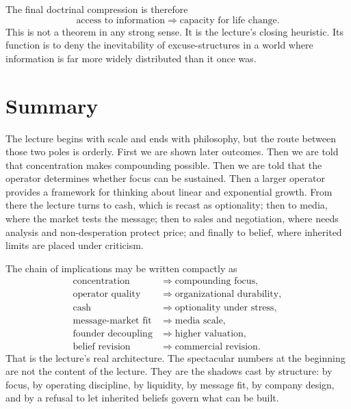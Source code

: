The final doctrinal compression is therefore
\begin{equation}
\text{access to information}\Rightarrow \text{capacity for life change}.
\end{equation}
This is not a theorem in any strong sense. It is the lecture's closing heuristic. Its function is to deny the inevitability of excuse-structures in a world where information is far more widely distributed than it once was.

\section{Summary}

The lecture begins with scale and ends with philosophy, but the route between those two poles is orderly. First we are shown later outcomes. Then we are told that concentration makes compounding possible. Then we are told that the operator determines whether focus can be sustained. Then a larger operator provides a framework for thinking about linear and exponential growth. From there the lecture turns to cash, which is recast as optionality; then to media, where the market tests the message; then to sales and negotiation, where needs analysis and non-desperation protect price; and finally to belief, where inherited limits are placed under criticism.

The chain of implications may be written compactly as
\begin{align}
\text{concentration} &\Rightarrow \text{compounding focus},\\
\text{operator quality} &\Rightarrow \text{organizational durability},\\
\text{cash} &\Rightarrow \text{optionality under stress},\\
\text{message-market fit} &\Rightarrow \text{media scale},\\
\text{founder decoupling} &\Rightarrow \text{higher valuation},\\
\text{belief revision} &\Rightarrow \text{commercial revision}.
\end{align}
That is the lecture's real architecture. The spectacular numbers at the beginning are not the content of the lecture. They are the shadows cast by structure: by focus, by operating discipline, by liquidity, by message fit, by company design, and by a refusal to let inherited beliefs govern what can be built.